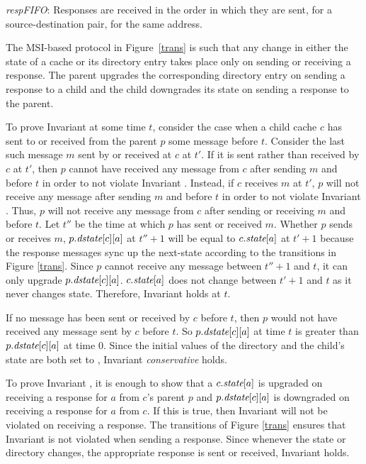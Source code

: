 \begin{inv}
\textit{respFIFO}: Responses are received in the order in which they are sent,
for a source-destination pair, for the same address.
\label{respFIFO}
\end{inv}

The MSI-based protocol in Figure~\ref{trans} is such that any change in either
the state of a cache or its directory entry takes place only on sending or
receiving a response. The parent upgrades the corresponding directory entry on
sending a response to a child and the child downgrades its state on
sending a response to the parent.

To prove Invariant  at some time $t$, consider the case
when a child cache $c$ has sent to or received from the parent $p$ some message
before $t$. Consider the last such message $m$ sent by or received at $c$ at
$t'$. If it is sent rather than received by $c$ at $t'$, then $p$ cannot have
received any message from $c$ after sending $m$ and before $t$ in order to not
violate Invariant .  Instead, if $c$ receives $m$ at $t'$,
$p$ will not receive any message after sending $m$ and before $t$ in order to
not violate Invariant . Thus, $p$ will not receive any message
from $c$ after sending or receiving $m$ and before $t$.  Let $t''$ be the time
at which $p$ has sent or received $m$. Whether $p$ sends or receives $m$,
$p.\textit{dstate}[c][a]$ at $t''+1$ will be equal to $c.\textit{state}[a]$ at $t'+1$ because
the response messages sync up the next-state according to the transitions in
Figure \ref{trans}. Since $p$ cannot receive any message between $t''+1$ and
$t$, it can only upgrade $p.\textit{dstate}[c][a]$. $c.\textit{state}[a]$ does not change
between $t'+1$ and $t$ as it never changes state. Therefore, Invariant
 holds at $t$.

If no message has been sent or received by $c$ before $t$, then $p$ would not
have received any message sent by $c$ before $t$. So $p.\textit{dstate}[c][a]$ at time
$t$ is greater than $p.\textit{dstate}[c][a]$ at time $0$. Since the initial values of the directory
and the child's state are both set to \In{}, Invariant \textit{conservative}
holds.

To prove Invariant , it is enough to show that a
$c.\textit{state}[a]$ is upgraded on receiving a response for $a$ from $c$'s parent $p$
and $p.\textit{dstate}[c][a]$ is downgraded on receiving a response for $a$ from $c$.
If this is true, then Invariant  will not be
violated on receiving a response. The transitions of Figure \ref{trans} ensures
that Invariant  is not violated when sending a
response. Since whenever the state or directory changes, the appropriate
response is sent or received, Invariant  holds.

